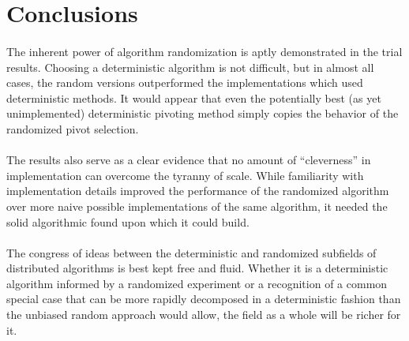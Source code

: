 \documentclass[11pt,epsf]{article}
\begin{document}
\section{Conclusions}{
  \paragraph{}{
    The inherent power of algorithm randomization is aptly demonstrated in the
    trial results. Choosing a deterministic algorithm is not difficult, but
    in almost all cases, the random versions outperformed the implementations
    which used deterministic methods. It would appear that even the potentially
    best (as yet unimplemented) deterministic pivoting method simply copies the
    behavior of the randomized pivot selection.
  }
  \paragraph{}{
    The results also serve as a clear evidence that no amount of ``cleverness''
    in implementation can overcome the tyranny of scale. While familiarity with
    implementation details improved the performance of the randomized algorithm
    over more naive possible implementations of the same algorithm, it needed
    the solid algorithmic found upon which it could build.
  }
  \paragraph{}{
    The congress of ideas between the deterministic and randomized subfields
    of distributed algorithms is best kept free and fluid. Whether it is a
    deterministic algorithm informed by a randomized experiment or a recognition
    of a common special case that can be more rapidly decomposed in a deterministic
    fashion than the unbiased random approach would allow, the field as a whole
    will be richer for it.
  }
}

\printbibliography
\end{document}
